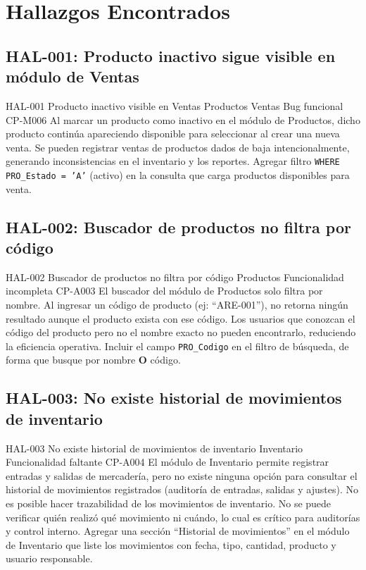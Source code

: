 \clearpage
\section{Hallazgos Encontrados}

\subsection{HAL-001: Producto inactivo sigue visible en módulo de Ventas}
\hallazgo
  {HAL-001}
  {Producto inactivo visible en Ventas}
  {\sevAlta}
  {Productos \arr{} Ventas}
  {Bug funcional}
  {CP-M006}
  {Al marcar un producto como inactivo en el módulo de Productos, dicho producto
   continúa apareciendo disponible para seleccionar al crear una nueva venta.}
  {Se pueden registrar ventas de productos dados de baja intencionalmente, generando
   inconsistencias en el inventario y los reportes.}
  {Agregar filtro \texttt{WHERE PRO\_Estado = 'A'} (activo) en la consulta que carga
   productos disponibles para venta.}

\subsection{HAL-002: Buscador de productos no filtra por código}
\hallazgo
  {HAL-002}
  {Buscador de productos no filtra por código}
  {\sevMedia}
  {Productos}
  {Funcionalidad incompleta}
  {CP-A003}
  {El buscador del módulo de Productos solo filtra por nombre. Al ingresar un código
   de producto (ej: ``ARE-001''), no retorna ningún resultado aunque el producto exista
   con ese código.}
  {Los usuarios que conozcan el código del producto pero no el nombre exacto no pueden
   encontrarlo, reduciendo la eficiencia operativa.}
  {Incluir el campo \texttt{PRO\_Codigo} en el filtro de búsqueda, de forma que busque
   por nombre \textbf{O} código.}

\subsection{HAL-003: No existe historial de movimientos de inventario}
\hallazgo
  {HAL-003}
  {No existe historial de movimientos de inventario}
  {\sevAlta}
  {Inventario}
  {Funcionalidad faltante}
  {CP-A004}
  {El módulo de Inventario permite registrar entradas y salidas de mercadería, pero no
   existe ninguna opción para consultar el historial de movimientos registrados
   (auditoría de entradas, salidas y ajustes).}
  {No es posible hacer trazabilidad de los movimientos de inventario. No se puede
   verificar quién realizó qué movimiento ni cuándo, lo cual es crítico para auditorías
   y control interno.}
  {Agregar una sección ``Historial de movimientos'' en el módulo de Inventario que liste
   los movimientos con fecha, tipo, cantidad, producto y usuario responsable.}

